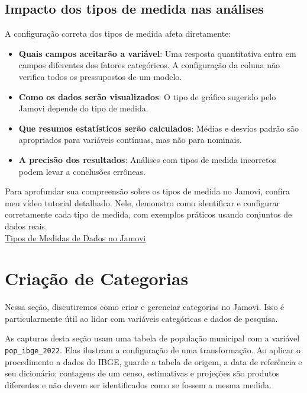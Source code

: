 \subsection{Impacto dos tipos de medida nas análises}

A configuração correta dos tipos de medida afeta diretamente:

\begin{itemize}
    \item \textbf{Quais campos aceitarão a variável}: Uma resposta quantitativa entra em campos diferentes dos fatores categóricos. A configuração da coluna não verifica todos os pressupostos de um modelo.
    \item \textbf{Como os dados serão visualizados}: O tipo de gráfico sugerido pelo Jamovi depende do tipo de medida.
    \item \textbf{Que resumos estatísticos serão calculados}: Médias e desvios padrão são apropriados para variáveis contínuas, mas não para nominais.
    \item \textbf{A precisão dos resultados}: Análises com tipos de medida incorretos podem levar a conclusões errôneas.
\end{itemize}

\begin{tcolorbox}[colback=white,colframe=red,title={\faPlayCircle \ Dica de Conteúdo}]
  Para aprofundar sua compreensão sobre os tipos de medida no Jamovi, confira meu vídeo tutorial detalhado. Nele, demonstro como identificar e configurar corretamente cada tipo de medida, com exemplos práticos usando conjuntos de dados reais.\\
  \textcolor{red}{\faYoutube} \href{https://youtu.be/398uFqX7NRA?si=wSLiUl3nIaABU5KJ}{Tipos de Medidas de Dados no Jamovi}
\end{tcolorbox}

\section{Criação de Categorias}
Nessa seção, discutiremos como criar e gerenciar categorias no Jamovi. Isso é particularmente útil ao lidar com variáveis categóricas e dados de pesquisa.

As capturas desta seção usam uma tabela de população municipal com a variável \texttt{pop\_ibge\_2022}. Elas ilustram a configuração de uma transformação. Ao aplicar o procedimento a dados do IBGE, guarde a tabela de origem, a data de referência e seu dicionário; contagens de um censo, estimativas e projeções são produtos diferentes e não devem ser identificados como se fossem a mesma medida.

